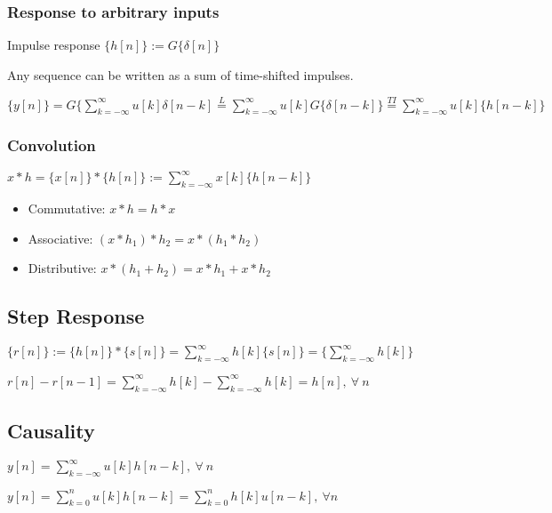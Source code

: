 \documentclass[8pt,a4paper]{scrartcl}
\begin{document}
\begin{multicols*}{3}
\subsubsection{Response to arbitrary inputs}

Impulse response $\{h[n]\}:=G\{\delta[n]\}$

Any sequence can be written as a sum of time-shifted impulses.

$\{y[n]\}=G\{\sum\limits_{k=-\infty}^\infty u[k]\delta[n-k]\overset{L}{=}\sum\limits_{k=-\infty}^\infty u[k]G\{\delta[n-k]\}\overset{TI}{=}\sum\limits_{k=-\infty}^\infty u[k]\{h[n-k]\}$

\subsubsection{Convolution}

$x\ast h=\{x[n]\}\ast\{h[n]\}:=\sum\limits_{k=-\infty}^\infty x[k]\{h[n-k]\}$

\begin{itemize}
\item Commutative: $x\ast h=h\ast x$
\item Associative: $(x\ast h_1)\ast h_2=x\ast (h_1\ast h_2)$
\item Distributive: $x\ast(h_1+h_2)=x\ast h_1+x\ast h_2$
\end{itemize}

\subsection{Step Response}

$\{r[n]\}:=\{h[n]\}\ast\{s[n]\}=\sum\limits_{k=-\infty}^\infty h[k]\{s[n]\}=\{\sum\limits_{k=-\infty}^\infty h[k]\}$

$r[n]-r[n-1]=\sum\limits_{k=-\infty}^\infty h[k]-\sum\limits_{k=-\infty}^\infty h[k]=h[n],\ \forall\ n$

\subsection{Causality}

$y[n]=\sum\limits_{k=-\infty}^\infty u[k]h[n-k],\ \forall\ n$



$y[n]=\sum\limits_{k=0}^nu[k]h[n-k]=\sum\limits_{k=0}^n h[k]u[n-k],\ \forall n$


\end{multicols*}
\end{document}
